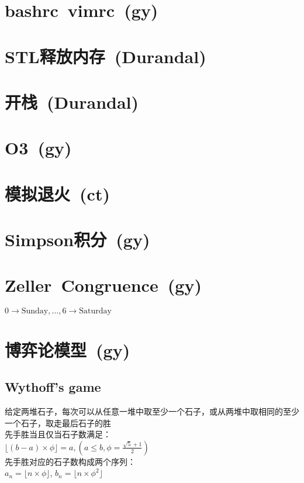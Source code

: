 \section{bashrc\ vimrc\ \small(gy)}
\section{STL释放内存\ \small(Durandal)}
\section{开栈\ \small(Durandal)}
\section{O3\ \small(gy)}
\section{模拟退火\ \small(ct)}
\section{Simpson积分\ \small(gy)}
\section{Zeller\ Congruence\ \small(gy)}
    $ 0 \to \text{Sunday} , \dots , 6 \to \text{Saturday} $
\section{博弈论模型\ \small(gy)}
    \subsection*{Wythoff's game}
        给定两堆石子，每次可以从任意一堆中取至少一个石子，或从两堆中取相同的至少一个石子，取走最后石子的胜
        \\先手胜当且仅当石子数满足：
        \\$\lfloor (b - a) \times \phi \rfloor=a, (a \leq b, \phi = \frac{\sqrt{5} + 1}{2})$
        \\先手胜对应的石子数构成两个序列：
        \\$a_n = \lfloor n \times \phi \rfloor$, $b_n = \lfloor n \times \phi ^ 2 \rfloor$
